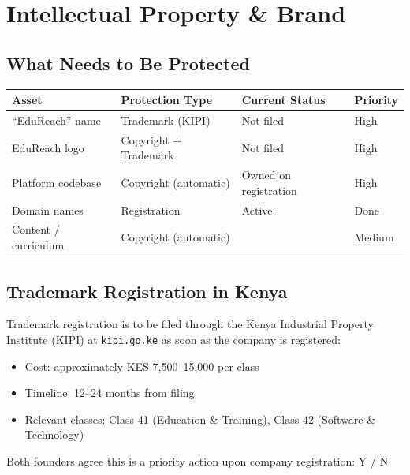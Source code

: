 \documentclass[12pt,a4paper]{article}
\newcommand{\blank}[1][5.5cm]{\underline{\hspace{#1}}}
\begin{document}
\section{Intellectual Property \& Brand}

\subsection{What Needs to Be Protected}

\begin{tabularx}{\linewidth}{L{3.5cm} L{4cm} L{3.5cm} C{2cm}}
  \toprule
  \textbf{Asset} & \textbf{Protection Type} & \textbf{Current Status} & \textbf{Priority} \\
  \midrule
  ``EduReach'' name    & Trademark (KIPI)          & Not filed           & High \\[0.3em]
  EduReach logo        & Copyright + Trademark     & Not filed           & High \\[0.3em]
  Platform codebase    & Copyright (automatic)     & Owned on registration & High \\[0.3em]
  Domain names         & Registration              & Active              & Done \\[0.3em]
  Content / curriculum & Copyright (automatic)     & \blank[2.5cm]       & Medium \\
  \bottomrule
\end{tabularx}

\subsection{Trademark Registration in Kenya}

Trademark registration is to be filed through the Kenya Industrial Property Institute (KIPI) at \texttt{kipi.go.ke} as soon as the company is registered:

\begin{itemize}
  \item Cost: approximately KES 7{,}500--15{,}000 per class
  \item Timeline: 12--24 months from filing
  \item Relevant classes: Class 41 (Education \& Training), Class 42 (Software \& Technology)
\end{itemize}

Both founders agree this is a priority action upon company registration: \quad Y \;/\; N
\end{document}
